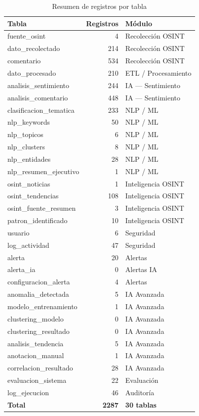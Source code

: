 \documentclass[11pt,a4paper]{article}
\begin{document}
\begin{table}[H]
\centering
\begin{tabularx}{\textwidth}{l r X}
\toprule
\textbf{Tabla} & \textbf{Registros} & \textbf{Módulo} \\
\midrule
fuente\_osint & 4 & Recolección OSINT \\
dato\_recolectado & 214 & Recolección OSINT \\
comentario & 534 & Recolección OSINT \\
dato\_procesado & 210 & ETL / Procesamiento \\
analisis\_sentimiento & 244 & IA — Sentimiento \\
analisis\_comentario & 448 & IA — Sentimiento \\
clasificacion\_tematica & 233 & NLP / ML \\
nlp\_keywords & 50 & NLP / ML \\
nlp\_topicos & 6 & NLP / ML \\
nlp\_clusters & 8 & NLP / ML \\
nlp\_entidades & 28 & NLP / ML \\
nlp\_resumen\_ejecutivo & 1 & NLP / ML \\
osint\_noticias & 1 & Inteligencia OSINT \\
osint\_tendencias & 108 & Inteligencia OSINT \\
osint\_fuente\_resumen & 3 & Inteligencia OSINT \\
patron\_identificado & 10 & Inteligencia OSINT \\
usuario & 6 & Seguridad \\
log\_actividad & 47 & Seguridad \\
alerta & 20 & Alertas \\
alerta\_ia & 0 & Alertas IA \\
configuracion\_alerta & 4 & Alertas \\
anomalia\_detectada & 5 & IA Avanzada \\
modelo\_entrenamiento & 1 & IA Avanzada \\
clustering\_modelo & 0 & IA Avanzada \\
clustering\_resultado & 0 & IA Avanzada \\
analisis\_tendencia & 5 & IA Avanzada \\
anotacion\_manual & 1 & IA Avanzada \\
correlacion\_resultado & 28 & IA Avanzada \\
evaluacion\_sistema & 22 & Evaluación \\
log\_ejecucion & 46 & Auditoría \\
\midrule
\textbf{Total} & \textbf{2287} & \textbf{30 tablas} \\
\bottomrule
\end{tabularx}
\caption{Resumen de registros por tabla}
\end{table}
\end{document}
